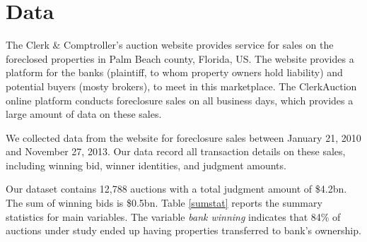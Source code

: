 \documentclass[11pt,twopage]{article}
\begin{document}
\section{Data}
\label{sec:data}

The Clerk \& Comptroller's auction website provides service for sales
on the foreclosed properties in Palm Beach county, Florida, US. The
website provides a platform for the banks (plaintiff, to whom property
owners hold liability) and potential buyers (mosty brokers), to meet
in this marketplace. The ClerkAuction online platform conducts
foreclosure sales on all business days, which provides a large amount
of data on these sales.

We collected data from the website for foreclosure sales between
January 21, 2010 and November 27, 2013. Our data record all
transaction details on these sales, including winning bid, winner
identities, and judgment
amounts.%



Our dataset contains 12,788 auctions with a total judgment amount of
\$4.2bn. The sum of winning bids is \$0.5bn.  Table \ref{sumstat}
reports the summary statistics for main variables.  The variable
\textit{bank winning} indicates that 84\% of auctions under study
ended up having properties transferred to bank's ownership.

\end{document}
